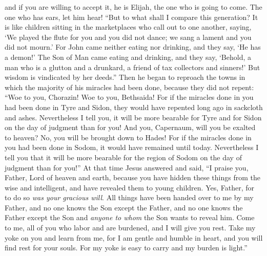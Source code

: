 \begin{biblechapter}
\verse and if you are willing to accept it, he is Elijah, the one who is going to come.
\verse The one who has ears, let him hear!
\verse “But to what shall I compare this generation? It is like children sitting in the marketplaces who call out to one another,
\verse saying, ‘We played the flute for you and you did not dance; 
we sang a lament and you did not mourn.’
\verse For John came neither eating nor drinking, and they say, ‘He has a demon!’
\verse The Son of Man came eating and drinking, and they say, ‘Behold, a man who is a glutton and a drunkard, a friend of tax collectors and sinners!’ But wisdom is vindicated by her deeds.”
 Then he began to reproach the towns in which the majority of his miracles had been done, because they did not repent:
\verse “Woe to you, Chorazin! Woe to you, Bethsaida! For if the miracles done in you had been done in Tyre and Sidon, they would have repented long ago in sackcloth and ashes.
\verse Nevertheless I tell you, it will be more bearable for Tyre and for Sidon on the day of judgment than for you!
\verse And you, Capernaum, will you be exalted to heaven? No, you will be brought down to Hades! For if the miracles done in you had been done in Sodom, it would have remained until today.
\verse Nevertheless I tell you that it will be more bearable for the region of Sodom on the day of judgment than for you!”
 At that time Jesus answered and said, “I praise you, Father, Lord of heaven and earth, because you have hidden these things from the wise and intelligent, and have revealed them to young children.
\verse Yes, Father, for to do so \textit{was your gracious will}.
\verse All things have been handed over to me by my Father, and no one knows the Son except the Father, and no one knows the Father except the Son and \textit{anyone to whom} the Son wants to reveal him.
\verse Come to me, all of you who labor and are burdened, and I will give you rest.
\verse Take my yoke on you and learn from me, for I am gentle and humble in heart, and you will find rest for your souls.
\verse For my yoke is easy to carry and my burden is light.”
\end{biblechapter}

